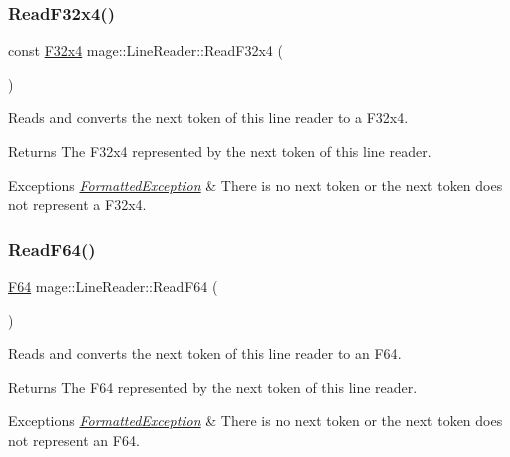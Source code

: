 \subsubsection{\texorpdfstring{Read\+F32x4()}{ReadF32x4()}}
{\footnotesize\ttfamily const \hyperlink{namespacemage_a9b8168505574a087f7391e56522fa584}{F32x4} mage\+::\+Line\+Reader\+::\+Read\+F32x4 (\begin{DoxyParamCaption}{ }\end{DoxyParamCaption})\hspace{0.3cm}{\ttfamily [protected]}}

Reads and converts the next token of this line reader to a {\ttfamily F32x4}.

\begin{DoxyReturn}{Returns}
The {\ttfamily F32x4} represented by the next token of this line reader. 
\end{DoxyReturn}

\begin{DoxyExceptions}{Exceptions}
{\em \hyperlink{classmage_1_1_formatted_exception}{Formatted\+Exception}} & There is no next token or the next token does not represent a {\ttfamily F32x4}. \\
\hline
\end{DoxyExceptions}
\hypertarget{classmage_1_1_line_reader_a8f1ae6467f871394fb62f2e5da3df3b9}{}\label{classmage_1_1_line_reader_a8f1ae6467f871394fb62f2e5da3df3b9} 
\subsubsection{\texorpdfstring{Read\+F64()}{ReadF64()}}
{\footnotesize\ttfamily \hyperlink{namespacemage_ad26233bbec640deda836e572c1a23708}{F64} mage\+::\+Line\+Reader\+::\+Read\+F64 (\begin{DoxyParamCaption}{ }\end{DoxyParamCaption})\hspace{0.3cm}{\ttfamily [protected]}}

Reads and converts the next token of this line reader to an {\ttfamily F64}.

\begin{DoxyReturn}{Returns}
The {\ttfamily F64} represented by the next token of this line reader. 
\end{DoxyReturn}

\begin{DoxyExceptions}{Exceptions}
{\em \hyperlink{classmage_1_1_formatted_exception}{Formatted\+Exception}} & There is no next token or the next token does not represent an {\ttfamily F64}. \\
\hline
\end{DoxyExceptions}
\hypertarget{classmage_1_1_line_reader_a6ee0c53351656ac4cd92db1d7c372cff}{}\label{classmage_1_1_line_reader_a6ee0c53351656ac4cd92db1d7c372cff} 
